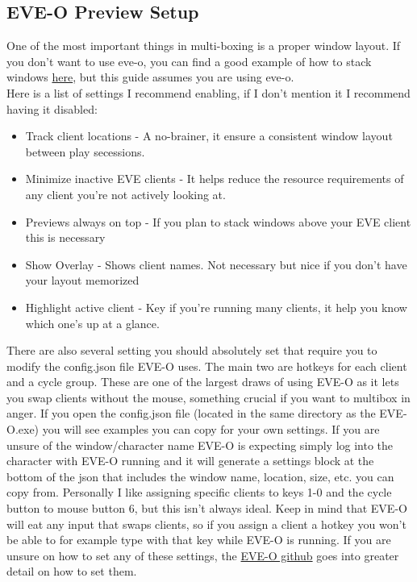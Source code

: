\documentclass{article}
\begin{document}
\subsection{EVE-O Preview Setup}
One of the most important things in multi-boxing is a proper window layout. If you don't want to use eve-o, you can find a good example of how to stack
windows \href{https://www.youtube.com/watch?v=xpiYxq3mpD8}{here}, but this guide assumes you are using eve-o.
\\
Here is a list of settings I recommend enabling, if I don't mention it I recommend having it disabled:
\begin{itemize}
  \item Track client locations - A no-brainer, it ensure a consistent window layout between play secessions.
  \item Minimize inactive EVE clients - It helps reduce the resource requirements of any client you're not actively looking at.
  \item Previews always on top - If you plan to stack windows above your EVE client this is necessary
  \item Show Overlay - Shows client names. Not necessary but nice if you don't have your layout memorized
  \item Highlight active client - Key if you're running many clients, it help you know which one's up at a glance.
\end{itemize}

There are also several setting you should absolutely set that require you to modify the config.json file EVE-O uses. The main two are hotkeys 
for each client and a cycle group. These are one of the largest draws of using EVE-O as it lets you swap clients without the mouse, something 
crucial if you want to multibox in anger. If you open the config.json file (located in the same directory as the EVE-O.exe) you will see examples 
you can copy for your own settings. If you are unsure of the window/character name EVE-O is expecting simply log into the character with EVE-O 
running and it will generate a settings block at the bottom of the json that includes the window name, location, size, etc. you can copy from. 
Personally I like assigning specific clients to keys 1-0 and the cycle button to mouse button 6, but this isn't always ideal. Keep in mind that 
EVE-O will eat any input that swaps clients, so if you assign a client a hotkey you won't be able to for example type with that key while EVE-O is 
running. If you are unsure on how to set any of these settings, the \href{URLhttps://github.com/Proopai/eve-o-preview}{EVE-O github} goes into 
greater detail on how to set them.
\end{document}
